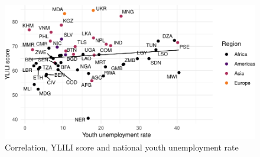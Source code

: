 \documentclass[
  a4paper, twoside, 12pt]{book}
\begin{document}
\begin{figure}[H]

{\centering \includegraphics{figures/fig-indexunemp-1} 

}

\caption{Correlation, YLILI score and national youth unemployment rate}\label{fig:fig-indexunemp}
\end{figure}
\end{document}
